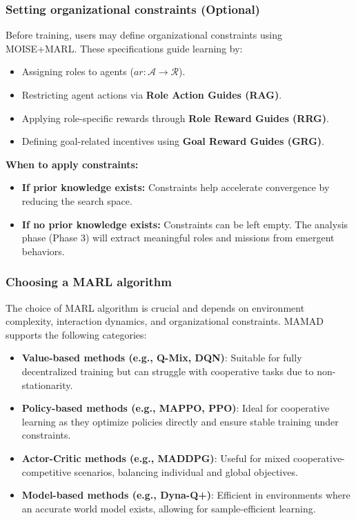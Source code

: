 \documentclass[pdflatex,sn-mathphys-num]{sn-jnl}%
\theoremstyle{thmstyleone}%
\theoremstyle{thmstyletwo}%
\theoremstyle{thmstylethree}%
\begin{document}
\subsubsection{Setting organizational constraints (Optional)}
Before training, users may define organizational constraints using MOISE+MARL. These specifications guide learning by:
\begin{itemize}
    \item Assigning roles to agents ($ar: \mathcal{A} \to \mathcal{R}$).
    \item Restricting agent actions via \textbf{Role Action Guides (RAG)}.
    \item Applying role-specific rewards through \textbf{Role Reward Guides (RRG)}.
    \item Defining goal-related incentives using \textbf{Goal Reward Guides (GRG)}.
\end{itemize}

\noindent \textbf{When to apply constraints:}
\begin{itemize}
    \item \textbf{If prior knowledge exists:} Constraints help accelerate convergence by reducing the search space.
    \item \textbf{If no prior knowledge exists:} Constraints can be left empty. The analysis phase (Phase 3) will extract meaningful roles and missions from emergent behaviors.
\end{itemize}

\subsubsection{Choosing a MARL algorithm}
The choice of MARL algorithm is crucial and depends on environment complexity, interaction dynamics, and organizational constraints. MAMAD supports the following categories:

\begin{itemize}
    \item \textbf{Value-based methods (e.g., Q-Mix, DQN)}: Suitable for fully decentralized training but can struggle with cooperative tasks due to non-stationarity.
    \item \textbf{Policy-based methods (e.g., MAPPO, PPO)}: Ideal for cooperative learning as they optimize policies directly and ensure stable training under constraints.
    \item \textbf{Actor-Critic methods (e.g., MADDPG)}: Useful for mixed cooperative-competitive scenarios, balancing individual and global objectives.
    \item \textbf{Model-based methods (e.g., Dyna-Q+)}: Efficient in environments where an accurate world model exists, allowing for sample-efficient learning.
\end{itemize}
\end{document}
